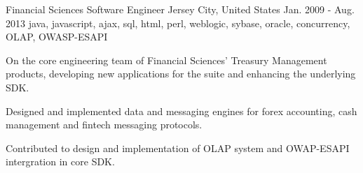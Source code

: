 \cventry
    {Financial Sciences} %
    {Software Engineer} %
    {Jersey City, United States} %
    {Jan. 2009 - Aug. 2013} %
    {java, javascript, ajax, sql, html, perl, weblogic, sybase, oracle, concurrency, OLAP, OWASP-ESAPI} %
    {
        On the core engineering team of Financial Sciences' Treasury Management products, developing new applications for the suite and enhancing the underlying SDK.
    \begin{cvitems} %
        \item { Designed and implemented data and messaging engines for forex accounting, cash management and fintech messaging protocols.}
        \item { Contributed to design and implementation of OLAP system and OWAP-ESAPI intergration in core SDK. }
    \end{cvitems}
    }
    